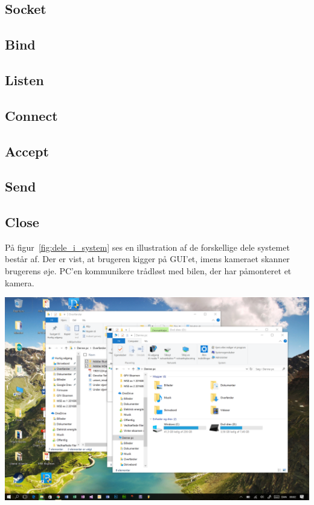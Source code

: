 \documentclass[12pt,fleqn,a4paper]{report}
\begin{document}
\subsection{Socket}

\subsection{Bind}
\subsection{Listen}
\subsection{Connect}
\subsection{Accept}
\subsection{Send}
\subsection{Close}


På figur~\ref{fig:dele_i_system} ses en illustration af de forskellige dele systemet består af. Der er vist, at brugeren kigger på GUI’et, imens kameraet skanner brugerens øje. PC’en kommunikere trådløst med bilen, der har påmonteret et kamera.

\begin{center}
	\includegraphics[width=0.9 \textwidth]{hej1.png}
	\label{fig:dele_i_system}
\end{center}

\newpage
\end{document}
